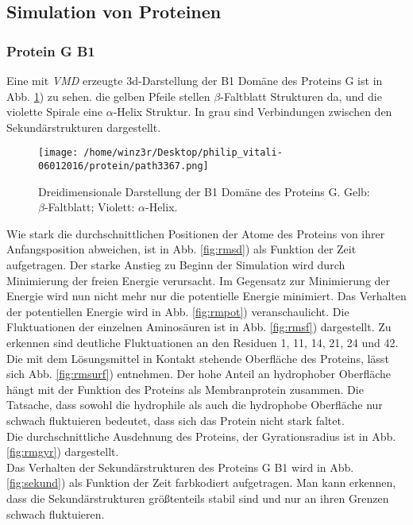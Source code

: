\subsection{Simulation von Proteinen}
\subsubsection{Protein G B1}
Eine mit \emph{VMD} erzeugte 3d-Darstellung der B1 Domäne des Proteins G ist in Abb. \ref{fig:3dpgb}) zu sehen.
die gelben Pfeile stellen $\beta$-Faltblatt Strukturen da, und die violette Spirale eine $\alpha$-Helix Struktur. In grau sind Verbindungen zwischen den Sekundärstrukturen dargestellt.
\begin{figure}
\centering
\texttt{[image: /home/winz3r/Desktop/philip\_vitali-06012016/protein/path3367.png]}\caption{Dreidimensionale Darstellung der B1 Domäne des Proteins G. Gelb: $\beta$-Faltblatt; Violett: $\alpha$-Helix.}\label{fig:3dpgb}
\end{figure}
\noindent
Wie stark die durchschnittlichen Positionen der Atome des Proteins von ihrer Anfangsposition abweichen, ist in Abb. \ref{fig:rmsd}) als Funktion der Zeit aufgetragen. Der starke Anstieg zu Beginn der Simulation wird durch Minimierung der freien Energie verursacht.
Im Gegensatz zur Minimierung der Energie wird nun nicht mehr nur die potentielle Energie minimiert.
Das Verhalten der potentiellen Energie wird in Abb. \ref{fig:rmpot}) veranschaulicht.
Die Fluktuationen der einzelnen Aminosäuren ist in Abb. \ref{fig:rmsf}) dargestellt. Zu erkennen sind deutliche Fluktuationen an den Residuen
1, 11, 14, 21, 24 und 42.
\\ \noindent
Die mit dem Lösungsmittel in Kontakt stehende Oberfläche des Proteins, lässt sich Abb. \ref{fig:rmsurf}) entnehmen. Der hohe Anteil an hydrophober Oberfläche hängt mit der Funktion des Proteins als Membranprotein zusammen. Die Tatsache, dass sowohl die hydrophile als auch die hydrophobe Oberfläche nur schwach fluktuieren bedeutet, dass sich das Protein nicht stark faltet.
\\ \noindent
Die durchschnittliche Ausdehnung des Proteins, der Gyrationsradius ist in Abb. \ref{fig:rmgyr}) dargestellt.
\\ \noindent
Das Verhalten der Sekundärstrukturen des Proteins G B1 wird in Abb. \ref{fig:sekund}) als Funktion der Zeit farbkodiert aufgetragen. Man kann erkennen, dass die Sekundärstrukturen
größtenteils stabil sind und nur an ihren Grenzen schwach fluktuieren.
